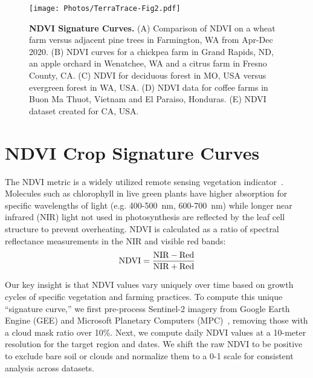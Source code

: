 \begin{figure}[t]
    \texttt{[image: Photos/TerraTrace-Fig2.pdf]}
    \vspace{-0.5cm}
    \caption{\textbf{NDVI Signature Curves.} (A) Comparison of  NDVI on a wheat farm versus adjacent pine trees in Farmington, WA from Apr-Dec 2020. (B) NDVI curves for a chickpea farm in Grand Rapids, ND, an apple orchard in Wenatchee, WA and a citrus farm in Fresno County, CA. (C) NDVI for deciduous forest in MO, USA versus evergreen forest in WA, USA. (D) NDVI data for coffee farms in Buon Ma Thuot, Vietnam and El Paraiso, Honduras. (E) NDVI dataset created for CA, USA.}
    \label{fig:Fig2}
    \vspace{-0.6cm}
\end{figure}

\section{NDVI Crop Signature Curves}
\label{signatures}
The NDVI metric is a widely utilized remote sensing vegetation indicator~\cite{USGS}. Molecules such as chlorophyll in live green plants have higher absorption for specific wavelengths of light (e.g. 400-500~nm, 600-700~nm) while longer near infrared (NIR) light not used in photosynthesis are reflected by the leaf cell structure to prevent overheating.%
NDVI is calculated as a ratio of spectral reflectance measurements in the NIR and visible red bands:
\vspace{-0.10cm}
\begin{equation}\label{eq:1}
    \text{NDVI} = \frac{\text{NIR} - \text{Red}}{\text{NIR} + \text{Red}}
    \vspace{-0.25cm}
\end{equation}

Our key insight is that NDVI values vary uniquely over time based on growth cycles of specific vegetation and farming practices. To compute this unique ``signature curve,'' we first pre-process Sentinel-2 imagery from Google Earth Engine (GEE) and Microsoft Planetary Computers (MPC)~\cite{GEE, Sentinel}, removing those with a cloud mask ratio over 10\%. Next, we compute daily NDVI values at a 10-meter resolution for the target region and dates.  We shift the raw NDVI to be positive to exclude bare soil or clouds and normalize them to a 0-1 scale for consistent analysis across datasets.

